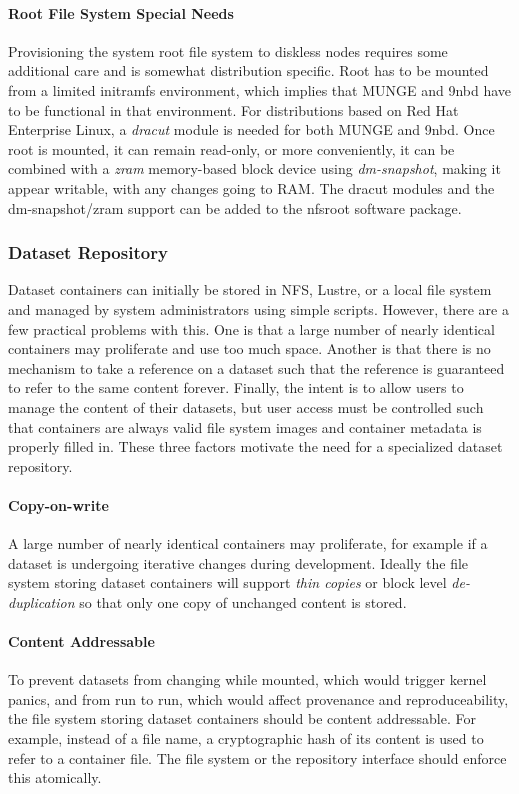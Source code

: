 \paragraph{Root File System Special Needs}
Provisioning the system root file system to diskless nodes requires
some additional care and is somewhat distribution specific.
Root has to be mounted from a limited initramfs environment, which
implies that MUNGE and 9nbd have to be functional in that environment.
For distributions based on Red Hat Enterprise Linux, a {\em dracut}
module is needed for both MUNGE and 9nbd.  Once root is mounted, it can
remain read-only, or more conveniently, it can be combined with a {\em zram}
memory-based block device using {\em dm-snapshot}, making it appear
writable, with any changes going to RAM.  The dracut modules and the
dm-snapshot/zram support can be added to the nfsroot\cite{nfsroot}
software package.

\subsubsection{Dataset Repository}

Dataset containers can initially be stored in NFS, Lustre, or a local file
system and managed by system administrators using simple scripts.
However, there are a few practical problems with this.
One is that a large number of nearly identical containers may proliferate
and use too much space.  Another is that there is no mechanism to take a
reference on a dataset such that the reference is guaranteed to refer to
the same content forever.
Finally, the intent is to allow users to manage the content of their datasets,
but user access must be controlled such that containers are always
valid file system images and container metadata is properly filled in.
These three factors motivate the need for a specialized dataset repository.

\paragraph{Copy-on-write}
A large number of nearly identical containers may proliferate, for example
if a dataset is undergoing iterative changes during development.
Ideally the file system storing dataset containers will support
{\em thin copies} or block level {\em de-duplication} so that only one
copy of unchanged content is stored.

\paragraph{Content Addressable}
To prevent datasets from changing while mounted, which would trigger
kernel panics, and from run to run, which would affect provenance and
reproduceability, the file system storing dataset containers should
be content addressable.  For example, instead of a file name, a cryptographic
hash of its content is used to refer to a container file.
The file system or the repository interface should enforce this atomically.

